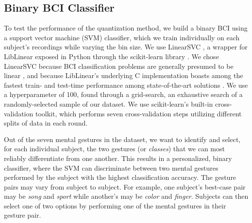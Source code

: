 \subsection{Binary BCI Classifier}

To test the performance of the quantization method, we build a binary BCI using a support vector machine (SVM) classifier, which we train individually on each subject's recordings while varying the bin size. We use LinearSVC \cite{fan_liblinear:_2008}, a wrapper for LibLinear exposed in Python through the scikit-learn library \cite{pedregosa_scikit-learn:_2011}. We chose LinearSVC because BCI classification problems are generally presumed to be linear  \cite{garrett_comparison_2003,lotte_review_2007}, and because LibLinear's underlying C implementation boasts among the fastest train- and test-time performance among state-of-the-art solutions \cite{fan_liblinear:_2008}. We use a hyperparameter of 100, found through a grid-search, an exhaustive search of a randomly-selected sample of our dataset. We use scikit-learn's built-in cross-validation toolkit, which performs seven cross-validation steps utilizing different splits of data in each round.

Out of the seven mental gestures in the dataset, we want to identify and select, for each individual subject, the two gestures (or \textit{classes}) that we can most reliably differentiate from one another. This results in a personalized, binary classifier, where the SVM can discriminate between two mental gestures performed by the subject with the highest classification accuracy. The gesture pairs may vary from subject to subject. For example, one subject's best-case pair may be \textit{song} and \textit{sport} while another's may be \textit{color} and \textit{finger}. Subjects can then select one of two options by performing one of the mental gestures in their gesture pair.

